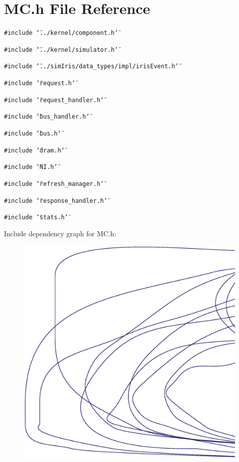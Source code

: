 \section{MC.h File Reference}
\label{MC_8h}
{\tt \#include \char`\"{}../kernel/component.h\char`\"{}}\par
{\tt \#include \char`\"{}../kernel/simulator.h\char`\"{}}\par
{\tt \#include \char`\"{}../simIris/data\_\-types/impl/irisEvent.h\char`\"{}}\par
{\tt \#include \char`\"{}request.h\char`\"{}}\par
{\tt \#include \char`\"{}request\_\-handler.h\char`\"{}}\par
{\tt \#include \char`\"{}bus\_\-handler.h\char`\"{}}\par
{\tt \#include \char`\"{}bus.h\char`\"{}}\par
{\tt \#include \char`\"{}dram.h\char`\"{}}\par
{\tt \#include \char`\"{}NI.h\char`\"{}}\par
{\tt \#include \char`\"{}refresh\_\-manager.h\char`\"{}}\par
{\tt \#include \char`\"{}response\_\-handler.h\char`\"{}}\par
{\tt \#include \char`\"{}stats.h\char`\"{}}\par


Include dependency graph for MC.h:\nopagebreak
\begin{figure}[H]
\begin{center}
\leavevmode
\includegraphics[width=420pt]{MC_8h__incl}
\end{center}
\end{figure}


